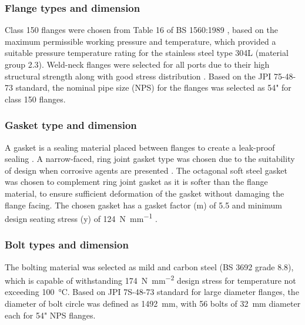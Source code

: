

\subsubsection{Flange types and dimension}
Class 150 flanges were chosen from Table 16 of BS 1560:1989 \cite{noauthor_circular_nodate}, based on the maximum permissible working pressure and temperature, which provided a suitable pressure temperature rating for the stainless steel type 304L (material group 2.3). Weld-neck flanges were selected for all ports due to their high structural strength along with good stress distribution \cite{ulma_forge_welding_2020}.
Based on the JPI 75-48-73 standard, the nominal pipe size (NPS) for the flanges was selected as 54" for class 150 flanges.

\subsubsection{Gasket type and dimension}
A gasket is a sealing material placed between flanges to create a leak-proof sealing \cite{varun_piping_nodate}. A narrow-faced, ring joint gasket type was chosen due to the suitability of design when corrosive agents are presented \cite{noauthor_ring_nodate}. The octagonal soft steel gasket was chosen to complement ring joint gasket as it is softer than the flange material, to ensure sufficient deformation of the gasket without damaging the flange facing. The chosen gasket has a gasket factor (m) of 5.5 and minimum design seating stress (y) of \SI{124}{\N\per\mm} \cite{noauthor_unfired_nodate}.

\subsubsection{Bolt types and dimension}
The bolting material was selected as mild and carbon steel (BS 3692 grade 8.8), which is capable of withstanding \SI{174}{\N\per\square\mm} design stress for temperature not exceeding \SI{100}{\celsius}. Based on JPI 7S-48-73 standard for large diameter flanges, the diameter of bolt circle was defined as \SI{1492}{\milli \metre}, with 56 bolts of \SI{32}{\milli \metre} diameter each for 54" NPS flanges. 

